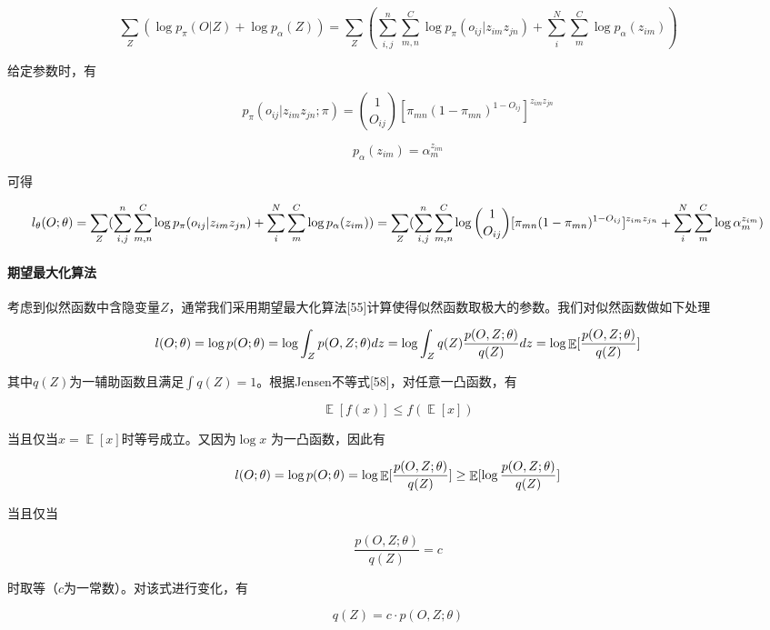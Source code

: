 \documentclass[
]{article}
\begin{document}
\[\sum_Z(\log p_{\pi}(O|Z)+\log p_\alpha(Z))=\sum_Z(\sum_{i,j}^{n}\sum_{m,n}^C\log p_\pi(o_{ij}|z_{im}z_{jn})
+\sum_{i}^N\sum_m^C\log p_\alpha(z_{im}))\]

给定参数时，有

\[p_\pi(o_{ij}|z_{im}z_{jn};\pi)=\binom{1}{O_{ij}}[\pi_{mn}(1-\pi_{mn})^{1-O_{ij}}]^{ z_{im}z_{jn}}\]

\[p_\alpha(z_{im})=\alpha_m^{z_{im}}\]

可得

\[l_\theta(O;\theta) = \sum_Z(\sum_{i,j}^{n}\sum_{m,n}^C\log p_\pi(o_{ij}|z_{im}z_{jn})+\sum_{i}^N\sum_m^C\log p_\alpha(z_
{im}))\\ =\sum_Z(\sum_{i,j}^{n}\sum_{m,n}^C\log \binom{1}{O_{ij}}[\pi_{mn}(1-\pi_{mn})^{1-O_{ij}}]^{ z_{im}z_{jn}}+\sum_
{i}^N\sum_m^C\log\alpha_m^{z_{im}})\]

\hypertarget{ux671fux671bux6700ux5927ux5316ux7b97ux6cd5}{%
\paragraph{期望最大化算法}\label{ux671fux671bux6700ux5927ux5316ux7b97ux6cd5}}

考虑到似然函数中含隐变量\(Z\)，通常我们采用期望最大化算法{[}55{]}计算使得似然函数取极大的参数。我们对似然函数做如下处理

\[l(O;\theta)=\log p(O;\theta)\\
=\log \int_Zp(O,Z;\theta)dz\\
=\log \int_Z q(Z)\frac{p(O,Z;\theta)}{q(Z)}dz\\
=\log \mathop{\mathbb{E}}[\frac{p(O,Z;\theta)}{q(Z)}]\]

其中\(q(Z)\)为一辅助函数且满足\(\int q(Z)=1\)。根据Jensen不等式{[}58{]}，对任意一凸函数，有

\[\mathop{\mathbb{E}}[f(x)]\leq f(\mathop{\mathbb{E}}[x])\]

当且仅当\(x=\mathop{\mathbb{E}}[x]\)时等号成立。又因为\(\log x\)
为一凸函数，因此有

\[l(O;\theta)=\log p(O;\theta)\\
=\log \mathop{\mathbb{E}}[\frac{p(O,Z;\theta)}{q(Z)}]\\
\geq  \mathop{\mathbb{E}}[\log\frac{p(O,Z;\theta)}{q(Z)}]\]

当且仅当

\[\frac{p(O,Z;\theta)}{q(Z)}=c\]

时取等（\(c\)为一常数）。对该式进行变化，有

\[q(Z)=c\cdot p(O,Z;\theta)\]
\end{document}
